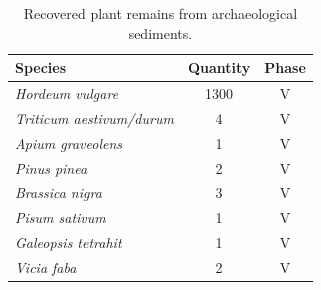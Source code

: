 \documentclass[preprint, 3p, authoryear]{elsarticle} %
\begin{document}
\begin{table}[!h]

\caption{\label{tab:table2}Recovered plant remains from archaeological sediments.}
\centering
\fontsize{7.5}{9.5}\selectfont
\begin{tabular}[t]{>{}lcc}
\toprule
Species & Quantity & Phase\\
\midrule
\em{Hordeum vulgare} & 1300 & V\\
\em{Triticum aestivum/durum} & 4 & V\\
\em{Apium graveolens} & 1 & V\\
\em{Pinus pinea} & 2 & V\\
\em{Brassica nigra} & 3 & V\\
\em{Pisum sativum} & 1 & V\\
\em{Galeopsis tetrahit} & 1 & V\\
\em{Vicia faba} & 2 & V\\
\bottomrule
\end{tabular}
\end{table}
\end{document}
